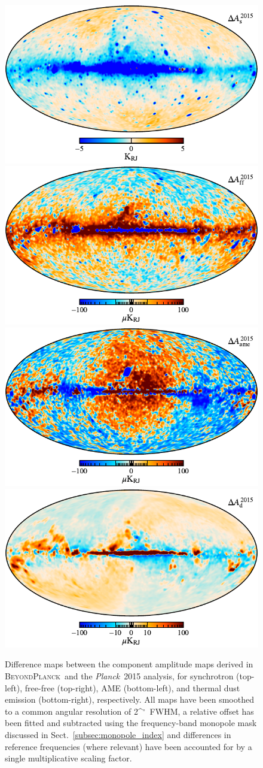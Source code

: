 \documentclass{aa}
\def\Planck{\textit{Planck}}
\def\deg{\ifmmode^\circ\else$^\circ$\fi}
\newcommand{\BP}{\textsc{BeyondPlanck}}
\begin{document}
\begin{figure}
  \center       
  \includegraphics[width=0.49\linewidth]{figs/synch_diff_BP10_dx11_MEAN_n0256_120arcmin_408MHz_uKRJ_MD_monocorr_T_w12_n256_cb_c-planck.pdf}
  \includegraphics[width=0.49\linewidth]{figs/ff_diff_bp_min_dx11_120arcmin_T_w12_n256_cb_c-planck.pdf} \\
  \includegraphics[width=0.49\linewidth]{figs/ame_diff_bp_min_dx11_at_22GHz_T_w12_n256_cb_c-planck.pdf} 
  \includegraphics[width=0.49\linewidth]{figs/dust_diff_gainscale_BP10_dx11_ML_120arcmin_545GHz_uKRJ_T_w12_n1024_cb_c-planck.pdf}  \\
  \caption{ Difference maps between the component amplitude maps
    derived in \BP\ and the \Planck\ 2015 analysis, for synchrotron
    (top-left), free-free (top-right), AME (bottom-left), and thermal dust emission (bottom-right),
    respectively. All maps have been smoothed to a common angular
    resolution of 2\deg\ FWHM, a relative offset has been fitted and subtracted
    using the frequency-band monopole mask discussed in
    Sect.~\ref{subsec:monopole_index} and differences in reference
    frequencies (where relevant) have been accounted for by a single
    multiplicative scaling factor.  }
  \label{fig:diff_maps}
\end{figure}
\end{document}
